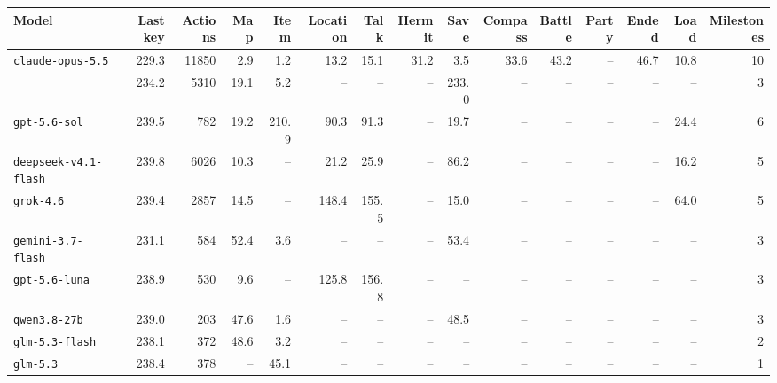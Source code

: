 \begin{tabular}{@{}lrrrrrrrrrrrrrr@{}}
\toprule
Model & Last key & Actions & Map & Item & Location & Talk & Hermit & Save & Compass & Battle & Party & Ended & Load & Milestones \\
\midrule
\texttt{claude-opus-5.5} & 229.3 & 11850 & 2.9 & 1.2 & 13.2 & 15.1 & 31.2 & 3.5 & 33.6 & 43.2 & -- & 46.7 & 10.8 & 10 \\
 & 234.2 & 5310 & 19.1 & 5.2 & -- & -- & -- & 233.0 & -- & -- & -- & -- & -- & 3 \\
\texttt{gpt-5.6-sol} & 239.5 & 782 & 19.2 & 210.9 & 90.3 & 91.3 & -- & 19.7 & -- & -- & -- & -- & 24.4 & 6 \\
\texttt{deepseek-v4.1-flash} & 239.8 & 6026 & 10.3 & -- & 21.2 & 25.9 & -- & 86.2 & -- & -- & -- & -- & 16.2 & 5 \\
\texttt{grok-4.6} & 239.4 & 2857 & 14.5 & -- & 148.4 & 155.5 & -- & 15.0 & -- & -- & -- & -- & 64.0 & 5 \\
\texttt{gemini-3.7-flash} & 231.1 & 584 & 52.4 & 3.6 & -- & -- & -- & 53.4 & -- & -- & -- & -- & -- & 3 \\
\texttt{gpt-5.6-luna} & 238.9 & 530 & 9.6 & -- & 125.8 & 156.8 & -- & -- & -- & -- & -- & -- & -- & 3 \\
\texttt{qwen3.8-27b} & 239.0 & 203 & 47.6 & 1.6 & -- & -- & -- & 48.5 & -- & -- & -- & -- & -- & 3 \\
\texttt{glm-5.3-flash} & 238.1 & 372 & 48.6 & 3.2 & -- & -- & -- & -- & -- & -- & -- & -- & -- & 2 \\
\texttt{glm-5.3} & 238.4 & 378 & -- & 45.1 & -- & -- & -- & -- & -- & -- & -- & -- & -- & 1 \\
\bottomrule
\end{tabular}
